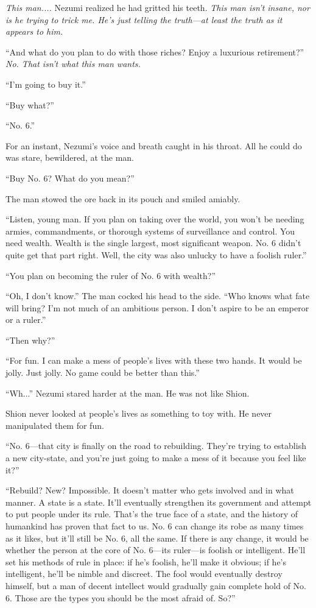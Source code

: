 \emph{This man....} Nezumi realized he had gritted his teeth. \emph{This man isn't
insane, nor is he trying to trick me. He's just telling the truth---at
least the truth as it appears to him.}

``And what do you plan to do with those riches? Enjoy a luxurious
retirement?'' \emph{No. That isn't what this man wants.}

``I'm going to buy it.''

``Buy what?''

``No. 6.''

For an instant, Nezumi's voice and breath caught in his throat. All he
could do was stare, bewildered, at the man.

``Buy No. 6? What do you mean?''

The man stowed the ore back in its pouch and smiled amiably.

``Listen, young man. If you plan on taking over the world, you won't be
needing armies, commandments, or thorough systems of surveillance and
control. You need wealth. Wealth is the single largest, most significant
weapon. No. 6 didn't quite get that part right. Well, the city was also
unlucky to have a foolish ruler.''

``You plan on becoming the ruler of No. 6 with wealth?''

``Oh, I don't know.'' The man cocked his head to the side. ``Who knows
what fate will bring? I'm not much of an ambitious person. I don't
aspire to be an emperor or a ruler.''

``Then why?''

``For fun. I can make a mess of people's lives with these two hands. It
would be jolly. Just jolly. No game could be better than this.''

``Wh...'' Nezumi stared harder at the man. He was not like Shion.~

Shion never looked at people's lives as something to toy with. He never
manipulated them for fun.

``No. 6---that city is finally on the road to rebuilding. They're trying
to establish a new city-state, and you're just going to make a mess of
it because you feel like it?''

``Rebuild? New? Impossible. It doesn't matter who gets involved and in
what manner. A state is a state. It'll eventually strengthen its
government and attempt to put people under its rule. That's the true
face of a state, and the history of humankind has proven that fact to
us. No. 6 can change its robe as many times as it likes, but it'll still
be No. 6, all the same. If there is any change, it would be whether the
person at the core of No. 6---its ruler---is foolish or intelligent. He'll
set his methods of rule in place: if he's foolish, he'll make it
obvious; if he's intelligent, he'll be nimble and discreet. The fool
would eventually destroy himself, but a man of decent intellect would
gradually gain complete hold of No. 6. Those are the types you should be
the most afraid of. So?''

